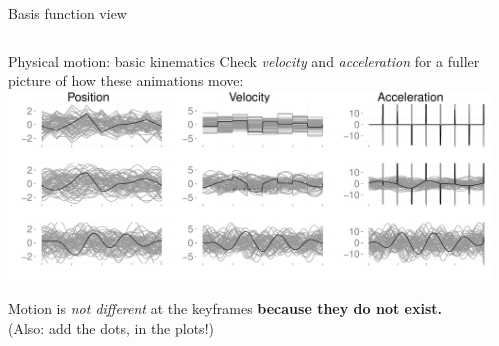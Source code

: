 \documentclass[final,t]{beamer}\usepackage[]{graphicx}\usepackage[]{color}
\makeatletter
\def\maxwidth{ %
  \ifdim\Gin@nat@width>\linewidth
    \linewidth
  \else
    \Gin@nat@width
  \fi
}
\newenvironment{knitrout}{}{} %
\newcommand{\cmark}{\ding{51}}%
\makeatother
\begin{document}
\begin{frame}[fragile]
\begin{columns}[T,onlytextwidth]
\begin{column}{.325\linewidth}
\begin{block}{Basis function view}
\begin{table}
\begin{tabular}{|l|c|c|c|}
\begin{knitrout}
\end{knitrout}

            & {\Huge \color{green}{\cmark}} & {\Huge \color{green}{\cmark}} &
            {\Huge \color{green}{\cmark}} \\
            \hline
          \end{tabular}
        \end{table}

      \end{block}

      \begin{block}{Physical motion: basic kinematics}
        {\small Check \textit{velocity} and \textit{acceleration} for a
        fuller picture of how these animations move:} \\
\begin{knitrout}
\color{fgcolor}
\includegraphics[width=\maxwidth]{figure/kinematics} 

\end{knitrout}

        Motion is \textit{not different} at the keyframes
        \textbf{because they do not exist.}
        \\ \tiny (Also: add the dots, in the plots!)
      \end{block}

    \end{column}

    \begin{column}{.325\linewidth}


\end{column}
\end{columns}
\end{frame}
\end{document}
